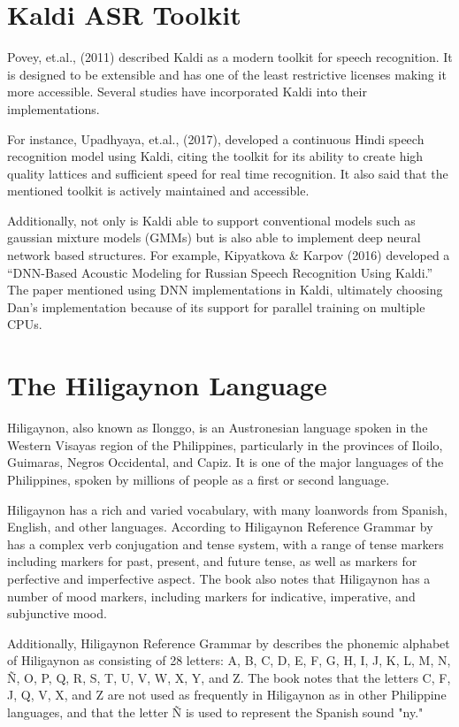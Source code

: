 \section{Kaldi ASR Toolkit}
Povey, et.al., (2011) described Kaldi as a modern toolkit for speech recognition. It is designed to be extensible and has one of the least restrictive licenses making it more accessible. Several studies have incorporated Kaldi into their implementations. 

For instance, Upadhyaya, et.al., (2017), developed a continuous Hindi speech recognition model using Kaldi, citing the toolkit for its ability to create high quality lattices and sufficient speed for real time recognition. It also said that the mentioned toolkit is actively maintained and accessible. 

Additionally, not only is Kaldi able to support conventional models such as gaussian mixture models (GMMs) but is also able to implement deep neural network based structures. For example, Kipyatkova \& Karpov (2016) developed a “DNN-Based Acoustic Modeling for Russian Speech Recognition Using Kaldi.” The paper mentioned using DNN implementations in Kaldi, ultimately choosing Dan’s implementation because of its support for parallel training on multiple CPUs.


\section{The Hiligaynon Language}
Hiligaynon, also known as Ilonggo, is an Austronesian language spoken in the Western Visayas region of the Philippines, particularly in the provinces of Iloilo, Guimaras, Negros Occidental, and Capiz. It is one of the major languages of the Philippines, spoken by millions of people as a first or second language.

Hiligaynon has a rich and varied vocabulary, with many loanwords from Spanish, English, and other languages. According to Hiligaynon Reference Grammar by \citeauthor{wolfenden-2019} \citeyear{wolfenden-2019} has a complex verb conjugation and tense system, with a range of tense markers including markers for past, present, and future tense, as well as markers for perfective and imperfective aspect. The book also notes that Hiligaynon has a number of mood markers, including markers for indicative, imperative, and subjunctive mood.

Additionally, Hiligaynon Reference Grammar by \citeauthor{wolfenden-2019} \citeyear{wolfenden-2019} describes the phonemic alphabet of Hiligaynon as consisting of 28 letters: A, B, C, D, E, F, G, H, I, J, K, L, M, N, Ñ, O, P, Q, R, S, T, U, V, W, X, Y, and Z. The book notes that the letters C, F, J, Q, V, X, and Z are not used as frequently in Hiligaynon as in other Philippine languages, and that the letter Ñ is used to represent the Spanish sound "ny."

















